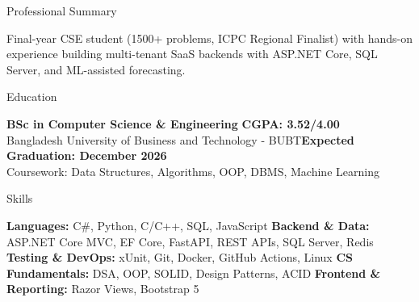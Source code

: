 \documentclass{resume}
\begin{document}

\begin{rSection}{Professional Summary}

Final-year CSE student (1500+ problems, ICPC Regional Finalist) with hands-on experience building multi-tenant SaaS backends with ASP.NET Core, SQL Server, and ML-assisted forecasting.

\end{rSection}


\begin{rSection}{Education}

{\bf BSc in Computer Science \& Engineering} \hfill{\bf CGPA: 3.52/4.00} \\
Bangladesh University of Business and Technology - BUBT\hfill {\bf Expected Graduation: December 2026} \\
{\footnotesize Coursework: Data Structures, Algorithms, OOP, DBMS, Machine Learning}

\end{rSection}


\begin{rSection}{Skills}

\textbf{Languages:} C\#, Python, C/C++, SQL, JavaScript
\newline
\textbf{Backend \& Data:} ASP.NET Core MVC, EF Core, FastAPI, REST APIs, SQL Server, Redis
\newline
\textbf{Testing \& DevOps:} xUnit, Git, Docker, GitHub Actions, Linux
\newline
\textbf{CS Fundamentals:} DSA, OOP, SOLID, Design Patterns, ACID
\newline
\textbf{Frontend \& Reporting:} Razor Views, Bootstrap 5

\end{rSection}

\end{document}
